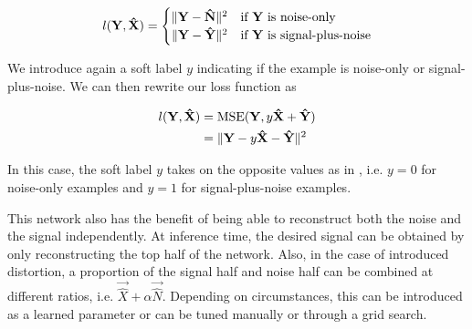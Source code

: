 \begin{equation}
l(\vec{Y}, \vec{\hat{X}}) =
    \begin{cases}
        \hfill \norm{\vec{Y}-\vec{\hat{N}}}^{2} \hfill & \text{if $\vec{Y}$ is noise-only}\\
        \hfill \norm{\vec{Y}-\vec{\hat{Y}}}^{2} & \text{if $\vec{Y}$ is signal-plus-noise}
    \end{cases}
\end{equation}

We introduce again a soft label $y$ indicating if the example is noise-only or signal-plus-noise. We can then rewrite our loss function as

\begin{align}
l(\mathbf{Y}, \mathbf{\hat{X}}) &= \text{MSE} (\mathbf{Y}, y\mathbf{\hat{X}}+\mathbf{\hat{Y}})\\
&= \lVert \mathbf{Y} - y\mathbf{\hat{X}}-\mathbf{\hat{Y}} \rVert^{2}
\end{align}

In this case, the soft label $y$ takes on the opposite values as in \cite{stow}, i.e. $y=0$ for noise-only examples and $y=1$ for signal-plus-noise examples.

This network also has the benefit of being able to reconstruct both the noise and the signal independently. At inference time, the desired signal can be obtained by only reconstructing the top half of the network. Also, in the case of introduced distortion, a proportion of the signal half and noise half can be combined at different ratios, i.e. $\vec{\hat{X}}+\alpha \vec{\hat{N}}$. Depending on circumstances, this can be introduced as a learned parameter or can be tuned manually or through a grid search.


